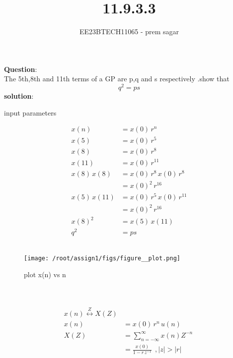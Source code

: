 \documentclass[journal,12pt,twocolumn]{IEEEtran}
\theoremstyle{remark}
\begin{document}

\vspace{3cm}

\title{11.9.3.3}
\author{EE23BTECH11065 - prem sagar}
\maketitle
\newpage

\bigskip 

\renewcommand{\thefigure}{\theenumi}
\renewcommand{\thetable}{\theenumi}
\textbf{Question}:\\ The 5th,8th and 11th terms of a GP are p,q and s respectively .show that \[q^2=ps\]
\textbf{solution}:
\\\begin{table}[!ht]
   \centering
      
    \caption{input parameters}
    \label{tab:11.9.3}
 \end{table}
\begin{align}
x(n)&= x(0)\,r^{n}
\\x(5)&=x(0)\,r^5
\\x(8)&=x(0)\,r^8
\\x({11})&=x(0)\,r^{11}
\\x(8)\,x(8)&=x(0)\,r^8\,x(0)\,r^8
     \\ &=x(0)^2\,r^{16}
\\x(5)\,x({11})&=x(0)\,r^5\,x(0)\,r^{11}
       \\&=x(0)^2\,r^{16}
\\x(8)^2&=x(5)\,x({11})
\\q^2&=ps
\end{align}   
\\\begin{figure}
    \centering
    \texttt{[image: /root/assign1/figs/figure\_\_plot.png]}
    \caption{plot x(n) vs n}
    \label{fig:1}
\end{figure}\\
\\\begin{align}
x(n)\overset{Z}{\longleftrightarrow}   X(Z)
\\x(n)&=x(0)\,r^n\,u(n)
\\X(Z)&=\sum_{n=-\infty}^{\infty}x(n) Z^{-n}\
     \\ &= \frac{x(0)}{1-r\,z^{-1}}\: \:,|z|>|r|
     \end{align}
\end{document}
